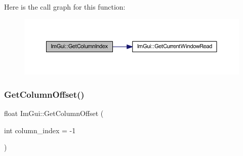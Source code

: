 Here is the call graph for this function\+:
\nopagebreak
\begin{figure}[H]
\begin{center}
\leavevmode
\includegraphics[width=350pt]{namespace_im_gui_acc31f8eea4fcfb86edeb3ac12d82fc05_cgraph}
\end{center}
\end{figure}
\mbox{\label{namespace_im_gui_a79c22e9c5c208b6c9534a273be71a9e6}} 
\subsubsection{\texorpdfstring{Get\+Column\+Offset()}{GetColumnOffset()}}
{\footnotesize\ttfamily float Im\+Gui\+::\+Get\+Column\+Offset (\begin{DoxyParamCaption}\item[{int}]{column\+\_\+index = {\ttfamily -\/1} }\end{DoxyParamCaption})}

